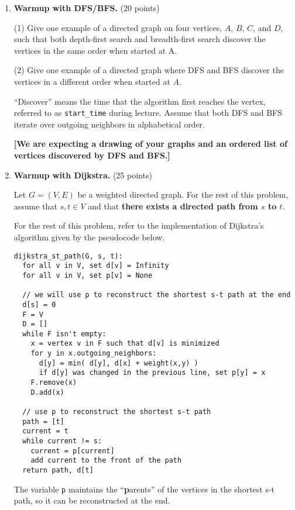 \documentclass[12pt]{article}
\begin{document}
\begin{enumerate}
  \item \textbf{Warmup with DFS/BFS.} (20 points)

(1) Give one example of a directed graph on four vertices, $A$, $B$, $C$, and $D$, such that both depth-first search and breadth-first search discover the vertices in the same order when started at A.  

(2) Give one example of a directed graph where DFS and BFS discover the vertices in a different order when started at $A$. 

``Discover'' means the time that the algorithm first reaches the vertex, referred to as \verb|start_time| during lecture. Assume that both DFS and BFS iterate over outgoing neighbors in alphabetical order.

  \textbf{[We are expecting a drawing of your graphs and an ordered list of vertices discovered by DFS and BFS.]}

  \item \textbf{Warmup with Dijkstra.} (25 points)

  Let $G = (V,E)$ be a weighted directed graph.  For the rest of this problem, assume that $s, t \in V$ and that \textbf{there exists a directed path from $s$ to $t$}.

For the rest of this problem, refer to the implementation of Dijkstra's algorithm given by the pseudocode below.

\newpage

\begin{verbatim}
dijkstra_st_path(G, s, t):
  for all v in V, set d[v] = Infinity
  for all v in V, set p[v] = None 
  
  // we will use p to reconstruct the shortest s-t path at the end
  d[s] = 0
  F = V
  D = []
  while F isn't empty:
    x = vertex v in F such that d[v] is minimized
    for y in x.outgoing_neighbors:
      d[y] = min( d[y], d[x] + weight(x,y) )
      if d[y] was changed in the previous line, set p[y] = x
    F.remove(x)
    D.add(x)
        
  // use p to reconstruct the shortest s-t path
  path = [t]
  current = t
  while current != s:
    current = p[current]
    add current to the front of the path
  return path, d[t]
\end{verbatim}

The variable \verb|p| maintains the ``\textbf{p}arents'' of the vertices in the shortest s-t path, so it can be reconstructed at the end.


\end{enumerate}
\end{document}
